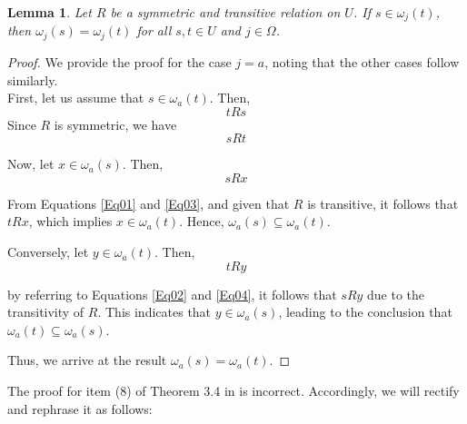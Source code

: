 \documentclass{article}
\theoremstyle{theorem}
\newtheorem{lemma}{Lemma}[section]
\theoremstyle{definition}
\theoremstyle{remark}
\begin{document}
\begin{lemma} \label{l1} Let $R$ be a symmetric and transitive relation on $U$. If $s \in \omega_{j}(t)$, then $\omega_{j}(s) = \omega_{j}(t)$ for all $s, t \in U$ and $j \in \Omega$.
\end{lemma}
\begin{proof}
We provide the proof for the case $j = a$, noting that the other cases follow similarly. \\

First, let us assume that $s \in \omega_{a}(t)$. Then,
\begin{equation}  \label{Eq01}
tRs
\end{equation}
Since $R$ is symmetric, we have
\begin{equation}  \label{Eq02}
sRt
\end{equation}

Now, let $x \in \omega_{a}(s)$. Then,
\begin{equation}  \label{Eq03}
sRx
\end{equation}

From Equations \ref{Eq01} and \ref{Eq03}, and given that $R$ is transitive, it follows that $tRx$, which implies $x \in \omega_{a}(t)$. Hence, $\omega_{a}(s) \subseteq \omega_{a}(t)$.

Conversely, let $y \in \omega_{a}(t)$. Then,
\begin{equation}  \label{Eq04}
tRy
\end{equation}

by referring to Equations \ref{Eq02} and \ref{Eq04}, it follows that $sRy$ due to the transitivity of $R$.
This indicates that $y \in \omega_{a}(s)$, leading to the conclusion that $\omega_{a}(t) \subseteq \omega_{a}(s)$.

Thus, we arrive at the result $\omega_{a}(s) = \omega_{a}(t)$.
\end{proof}

The proof for item (8) of Theorem 3.4 in \cite{Al-shami 2024} is incorrect. Accordingly, we will rectify  and rephrase it as follows:
\end{document}
